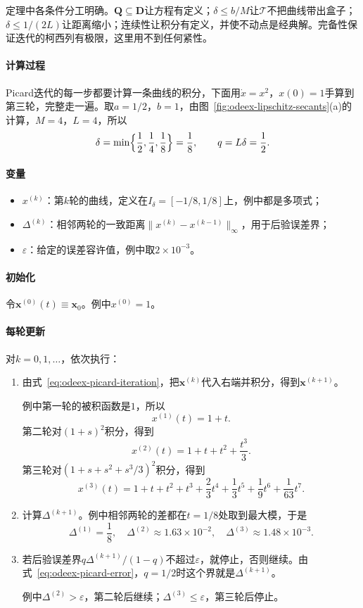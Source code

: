 定理中各条件分工明确。$\bm{Q}\subseteq\bm{D}$让方程有定义；$\delta\leq b/M$让$\mathcal{T}$不把曲线带出盒子；$\delta\leq1/(2L)$让距离缩小；连续性让积分有定义，并使不动点是经典解。完备性保证迭代的柯西列有极限，这里用不到任何紧性。

\paragraph{计算过程}
Picard迭代的每一步都要计算一条曲线的积分，下面用$\dot x=x^2$，$x(0)=1$手算到第三轮，完整走一遍。取$a=1/2$，$b=1$，由图~\ref{fig:odeex-lipschitz-secants}(a)的计算，$M=4$，$L=4$，所以
\[
 \delta=\min\Bigl\{\frac12,\frac14,\frac18\Bigr\}=\frac18,\qquad q=L\delta=\frac12.
\]

\paragraph{变量}
\begin{itemize}
 \item $x^{(k)}$：第$k$轮的曲线，定义在$I_\delta=[-1/8,1/8]$上，例中都是多项式；
 \item $\Delta^{(k)}$：相邻两轮的一致距离$\lVert x^{(k)}-x^{(k-1)}\rVert_{\infty}$，用于后验误差界；
 \item $\varepsilon$：给定的误差容许值，例中取$2\times10^{-3}$。
\end{itemize}

\paragraph{初始化}
令$\bm{x}^{(0)}(t)\equiv\bm{x}_0$。例中$x^{(0)}=1$。

\paragraph{每轮更新}
对$k=0,1,\ldots$，依次执行：
\begin{enumerate}
 \item 由式~\eqref{eq:odeex-picard-iteration}，把$\bm{x}^{(k)}$代入右端并积分，得到$\bm{x}^{(k+1)}$。

 例中第一轮的被积函数是$1$，所以
 \[
 x^{(1)}(t)=1+t.
 \]
 第二轮对$(1+s)^2$积分，得到
 \[
 x^{(2)}(t)=1+t+t^2+\frac{t^3}{3}.
 \]
 第三轮对$(1+s+s^2+s^3/3)^2$积分，得到
 \[
 x^{(3)}(t)=1+t+t^2+t^3+\frac23t^4+\frac13t^5+\frac19t^6+\frac{1}{63}t^7.
 \]
 \item 计算$\Delta^{(k+1)}$。例中相邻两轮的差都在$t=1/8$处取到最大模，于是
 \[
 \Delta^{(1)}=\frac18,\quad \Delta^{(2)}\approx1.63\times10^{-2},\quad \Delta^{(3)}\approx1.48\times10^{-3}.
 \]
 \item 若后验误差界$q\Delta^{(k+1)}/(1-q)$不超过$\varepsilon$，就停止，否则继续。由式~\eqref{eq:odeex-picard-error}，$q=1/2$时这个界就是$\Delta^{(k+1)}$。

 例中$\Delta^{(2)}>\varepsilon$，第二轮后继续；$\Delta^{(3)}\leq\varepsilon$，第三轮后停止。
\end{enumerate}


